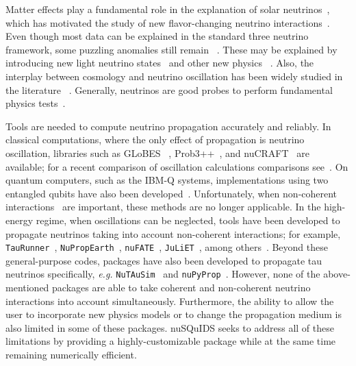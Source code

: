 \documentclass[3p,12pt]{elsarticle}
\newcommand{\ttf}{\ttfamily}
\begin{document}
Matter effects play a fundamental role in the explanation of solar
neutrinos~\citep{ Davis:1968cp,Bethe:1986ej}, which has motivated the study of new flavor-changing
neutrino interactions~\citep{Barger:1991ae, Roulet:1991sm, GonzalezGarcia:2011my,
  Gonzalez-Garcia:2013usa, Pospelov:2011dp, Kopp:2014nosterile,
  Maltoni:2015kca,Esteban:2018ppq}.
Even though most data can be explained in the standard three
neutrino framework, some puzzling anomalies still remain
~\citep{LSND,Mention:2011rr,MiniBoone:2012dn,Aguilar-Arevalo:2018gpe,Alekseev:2016llm,
  Ko:2016owz, Ashenfelter:2018iov, Abreu:2018pxg,
  Dentler:2018sju}. These may be explained 
by introducing new light neutrino states~\citep{kopp2013sterile,
  Collin:2016rao, Abazajian:2012rf,Blennow:2018hto, Dentler:2018sju, Diaz:2019fwt, Boser:2019rta} and other new physics
~\citep{Palomares-Ruiz:2005zbh,Gninenko:2009ks,Nelson:2010hz,Fan:2012ca,Bai:2015ztj,Bertuzzo:2018itn,Ballett:2019pyw,Arguelles:2018mtc,Dentler:2019dhz,Ahn:2019jbm,deGouvea:2019qre,Abdallah:2020vgg,Hostert:2020oui,Brdar:2020tle,Abdallah:2020biq,Dutta:2021cip,Vergani:2021tgc}.
Also, the interplay between cosmology and neutrino
oscillation has been widely studied in the literature
~\citep{Bergstrom:2014fqa, Giusarma:2016phn,
  Dasgupta:2013la,Hernandez:2016kel,Arguelles:2016uwb,Song:2018zyl,Chu:2018gxk}. 
Generally, neutrinos are good probes to perform 
fundamental physics tests~\citep{Hewett:2012et,Aartsen:2017ibm,Mewes:2018cze,Barenboim:2017vlc}.

Tools are needed to compute neutrino
propagation accurately and reliably.
In classical computations, where the only effect of propagation is neutrino oscillation, libraries such as {\ttf GLoBES}
~\citep{Huber:2007ji}, {\ttf Prob3++}~\citep{prob3pp, Calland:2013vaa},
and {\ttf nuCRAFT}~\citep{Wallraff:2014vl} are
available; for a recent comparison of oscillation calculations comparisons see~\cite{Parke:2019vbs}.
On quantum computers, such as the IBM-Q systems, implementations using two entangled qubits have also been developed~\cite{Arguelles:2019phs}.
Unfortunately, when non-coherent interactions~\cite{Formaggio:2012cpf,Gandhi:1998ri,Zhou:2019frk,Zhou:2019vxt} are
important, these methods are no longer applicable.
In the high-energy regime, when oscillations can be neglected, tools have been developed
to propagate neutrinos taking into account non-coherent interactions; for example, \texttt{TauRunner}~\cite{Safa:2021ghs}, \texttt{NuPropEarth}~\cite{Garcia:2020jwr}, \texttt{nuFATE}~\cite{Vincent:2017svp}, \texttt{JuLiET}~\cite{Yoshida:2003js,shigeruyoshida_2020_4018117}, among others~\citep{Gazizov:2004va,DeYoung:865626}.
Beyond these general-purpose codes, packages have also been developed to propagate tau neutrinos specifically, \textit{e.g.} \texttt{NuTAuSim}~\cite{Alvarez-Muniz:2018owm} and \texttt{nuPyProp}~\cite{NuSpaceSim:2021hgs}.
However, none of the above-mentioned packages are able to take 
coherent and non-coherent neutrino interactions into account simultaneously.
Furthermore, the ability to allow the user to incorporate new physics models or to change the
propagation medium is also limited in some of these packages. {\ttf nuSQuIDS} seeks to
address all of these limitations by providing a highly-customizable
package while at the same time remaining numerically efficient.
\end{document}
